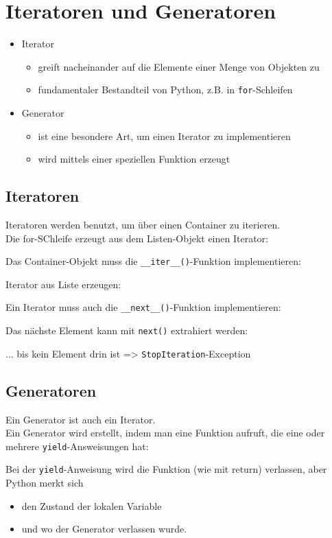 \section{Iteratoren und Generatoren}
\begin{itemize}
	\item Iterator
	\begin{itemize}
		\item greift nacheinander auf die Elemente einer Menge von Objekten zu
		\item fundamentaler Bestandteil von Python, z.B. in \texttt{for}-Schleifen
	\end{itemize}
	\item Generator
	\begin{itemize}
		\item ist eine besondere Art, um einen Iterator zu implementieren
		\item wird mittels einer speziellen Funktion erzeugt
	\end{itemize}
\end{itemize}

\subsection{Iteratoren}
Iteratoren werden benutzt, um über einen Container zu iterieren.\\
Die for-SChleife erzeugt aus dem Listen-Objekt einen Iterator:

Das Container-Objekt muss die \texttt{\_\_iter\_\_()}-Funktion implementieren:

Iterator aus Liste erzeugen:

Ein Iterator muss auch die \texttt{\_\_next\_\_()}-Funktion implementieren:

Das nächste Element kann mit \texttt{next()} extrahiert werden:

... bis kein Element drin ist => \texttt{StopIteration}-Exception


\subsection{Generatoren}
Ein Generator ist auch ein Iterator.\\
Ein Generator wird erstellt, indem man eine Funktion aufruft, die eine oder mehrere \texttt{yield}-Answeisungen hat:

Bei der \texttt{yield}-Anweisung wird die Funktion (wie mit return) verlassen, aber Python merkt sich
\begin{itemize}
	\item den Zustand der lokalen Variable
	\item und wo der Generator verlassen wurde.
\end{itemize}


